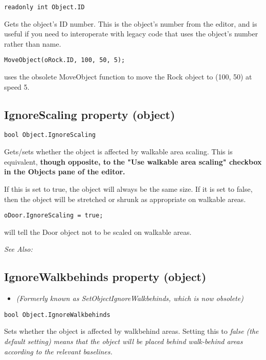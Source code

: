 \begin{verbatim}
readonly int Object.ID
\end{verbatim}
Gets the object's ID number. This is the object's number from the editor, and is
useful if you need to interoperate with legacy code that uses the object's number
rather than name.

\begin{verbatim}
MoveObject(oRock.ID, 100, 50, 5);
\end{verbatim}
uses the obsolete MoveObject function to move the Rock object to (100, 50) at speed 5.


\subsection{IgnoreScaling property (object)}\label{Object.IgnoreScaling}%

\begin{verbatim}
bool Object.IgnoreScaling
\end{verbatim}
Gets/sets whether the object is affected by walkable area scaling. This is equivalent,
\bf{though opposite}, to the "Use walkable area scaling" checkbox in the Objects pane of the editor.

If this is set to true, the object will always be the same size. If it is set to false, then
the object will be stretched or shrunk as appropriate on walkable areas.

\begin{verbatim}
oDoor.IgnoreScaling = true;
\end{verbatim}
will tell the Door object not to be scaled on walkable areas.

\it{See Also:} 


\subsection{IgnoreWalkbehinds property (object)}\label{Object.IgnoreWalkbehinds}%

\begin{itemize}
\item \it{(Formerly known as SetObjectIgnoreWalkbehinds, which is now obsolete)}
\end{itemize}

\begin{verbatim}
bool Object.IgnoreWalkbehinds
\end{verbatim}
Sets whether the object is affected by walkbehind areas. Setting this to \it{false}
(the default setting) means that the object will be placed behind walk-behind
areas according to the relevant baselines.

